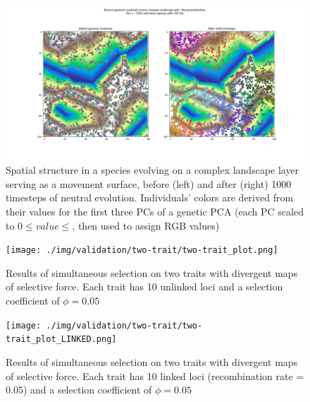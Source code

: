 ﻿\documentclass{article}
\begin{document}
\begin{figure}[h!]
        \includegraphics[width=175mm]{./img/validation/PCA/PCA_plot.png}
        \caption{Spatial structure in a species evolving on a complex landscape layer serving as a movement surface, before (left) and after (right) 1000 timesteps of neutral evolution. Individuals' colors are derived from their values for the first three PCs of a genetic PCA (each PC scaled to $0\leq value\leq$, then used to assign RGB values)}
        \label{fig:PCA}
\end{figure}


\begin{figure}[h!]
        \texttt{[image: ./img/validation/two-trait/two-trait\_plot.png]}
        \caption{Results of simultaneous selection on two traits with divergent maps of selective force. Each trait has 10 unlinked loci and a selection coefficient of $\phi = 0.05$}
        \label{fig:two_trait_unlinked}
\end{figure}


\begin{figure}[h!]
        \texttt{[image: ./img/validation/two-trait/two-trait\_plot\_LINKED.png]}
        \caption{Results of simultaneous selection on two traits with divergent maps of selective force. Each trait has 10 linked loci (recombination rate = 0.05) and a selection coefficient of $\phi = 0.05$}
        \label{fig:two_trait_linked}
\end{figure}
\end{document}
